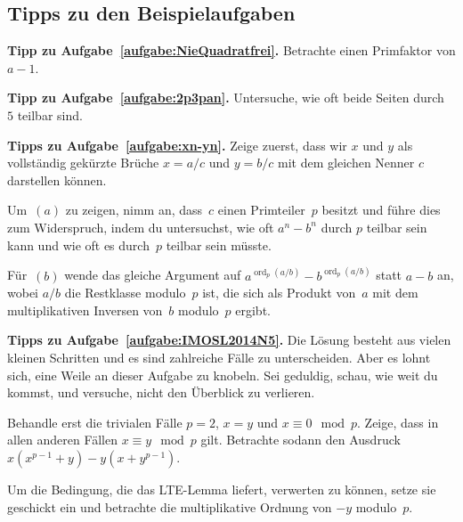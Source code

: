 \subsection*{Tipps zu den Beispielaufgaben}


\textbf{Tipp zu Aufgabe~\ref{aufgabe:NieQuadratfrei}.} Betrachte einen Primfaktor von $a-1$.

\textbf{Tipp zu Aufgabe~\ref{aufgabe:2p3pan}.} Untersuche, wie oft beide Seiten durch~$5$ teilbar sind.


\textbf{Tipps zu Aufgabe~\ref{aufgabe:xn-yn}.} Zeige zuerst, dass wir $x$ und $y$ als vollständig gekürzte Brüche $x=a/c$ und $y=b/c$ mit dem gleichen Nenner $c$ darstellen können.

Um~$(a)$ zu zeigen, nimm an, dass~$c$ einen Primteiler~$p$ besitzt und führe dies zum Widerspruch, indem du untersuchst, wie oft $a^n-b^n$ durch $p$ teilbar sein kann und wie oft es durch~$p$ teilbar sein müsste.

Für~$(b)$ wende das gleiche Argument auf $a^{\operatorname{ord}_p(a/b)}-b^{\operatorname{ord}_p(a/b)}$ statt $a-b$ an, wobei $a/b$ die Restklasse modulo~$p$ ist, die sich als Produkt von~$a$ mit dem multiplikativen Inversen von~$b$ modulo~$p$ ergibt.

\textbf{Tipps zu Aufgabe~\ref{aufgabe:IMOSL2014N5}.} Die Lösung besteht aus vielen kleinen Schritten und es sind zahlreiche Fälle zu unterscheiden. Aber es lohnt sich, eine Weile an dieser Aufgabe zu knobeln. Sei geduldig, schau, wie weit du kommst, und versuche, nicht den Überblick zu verlieren.

Behandle erst die trivialen Fälle $p=2$, $x=y$ und $x\equiv 0\mod p$. Zeige, dass in allen anderen Fällen $x\equiv y\mod p$ gilt. Betrachte sodann den Ausdruck $x(x^{p-1}+y)-y(x+y^{p-1})$.

Um die Bedingung, die das LTE-Lemma liefert, verwerten zu können, setze sie geschickt ein und betrachte die multiplikative Ordnung von $-y$ modulo~$p$.